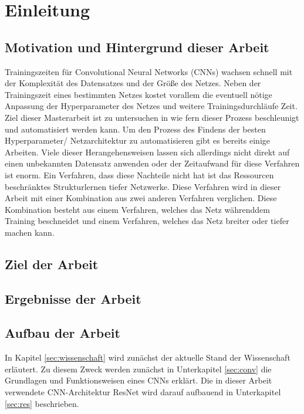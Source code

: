 \chapter{Einleitung}
\label{sec:EinleitungGesamt}

\section{Motivation und Hintergrund dieser Arbeit}

Trainingszeiten für Convolutional Neural Networks (CNNs) wachsen schnell mit der Komplexität des Datensatzes und der Größe des Netzes. Neben der Trainingszeit eines bestimmten Netzes kostet vorallem die eventuell nötige Anpassung der Hyperparameter des Netzes und weitere Trainingsdurchläufe Zeit. Ziel dieser Masterarbeit ist zu untersuchen in wie fern dieser Prozess beschleunigt und automatisiert werden kann. Um den Prozess des Findens der besten Hyperparameter/ Netzarchitektur zu automatisieren gibt es bereits einige Arbeiten. Viele dieser Herangehensweisen lassen sich allerdings nicht direkt auf einen unbekannten Datensatz anwenden oder der Zeitaufwand für diese Verfahren ist enorm. Ein Verfahren, dass diese Nachteile nicht hat ist das Ressourcen beschränktes Strukturlernen tiefer Netzwerke. Diese Verfahren wird in dieser Arbeit mit einer Kombination aus zwei anderen Verfahren verglichen. Diese Kombination besteht aus einem Verfahren, welches das Netz währenddem Training beschneidet und einem Verfahren, welches das Netz breiter oder tiefer machen kann.

\section{Ziel der Arbeit}




\section{Ergebnisse der Arbeit}


\section{Aufbau der Arbeit}
In Kapitel \ref{sec:wissenschaft} wird zunächst der aktuelle Stand der Wissenschaft erläutert. Zu diesem Zweck werden zunächst in Unterkapitel \ref{sec:conv} die Grundlagen und Funktionsweisen eines CNNs erklärt. Die in dieser Arbeit verwendete CNN-Architektur ResNet wird darauf aufbauend in Unterkapitel \ref{sec:res} beschrieben.


